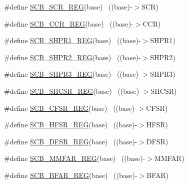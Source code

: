 \begin{DoxyCompactItemize}
\#define \hyperlink{group___s_c_b___register___accessor___macros_ga6cd310502ec11012af2420c92138fb04}{S\+C\+B\+\_\+\+S\+C\+R\+\_\+\+R\+EG}(base)                                            ~((base)-\/$>$S\+CR)
\item 
\#define \hyperlink{group___s_c_b___register___accessor___macros_gae2955c3c122b0cd8454d0015bcac2780}{S\+C\+B\+\_\+\+C\+C\+R\+\_\+\+R\+EG}(base)                                            ~((base)-\/$>$C\+CR)
\item 
\#define \hyperlink{group___s_c_b___register___accessor___macros_gaabf25516ecaf00639084a339a204456f}{S\+C\+B\+\_\+\+S\+H\+P\+R1\+\_\+\+R\+EG}(base)                                        ~((base)-\/$>$S\+H\+P\+R1)
\item 
\#define \hyperlink{group___s_c_b___register___accessor___macros_gaeb160566ffdd3572f046e69f3b79e3e8}{S\+C\+B\+\_\+\+S\+H\+P\+R2\+\_\+\+R\+EG}(base)                                        ~((base)-\/$>$S\+H\+P\+R2)
\item 
\#define \hyperlink{group___s_c_b___register___accessor___macros_ga8c93949e94df4ece6b4fafd94cca708d}{S\+C\+B\+\_\+\+S\+H\+P\+R3\+\_\+\+R\+EG}(base)                                        ~((base)-\/$>$S\+H\+P\+R3)
\item 
\#define \hyperlink{group___s_c_b___register___accessor___macros_ga84042bf531b908ba8afa2bb260acfdb1}{S\+C\+B\+\_\+\+S\+H\+C\+S\+R\+\_\+\+R\+EG}(base)                                        ~((base)-\/$>$S\+H\+C\+SR)
\item 
\#define \hyperlink{group___s_c_b___register___accessor___macros_ga5e429651ec37af4146f8ac231cb483be}{S\+C\+B\+\_\+\+C\+F\+S\+R\+\_\+\+R\+EG}(base)                                          ~((base)-\/$>$C\+F\+SR)
\item 
\#define \hyperlink{group___s_c_b___register___accessor___macros_ga82f9f02807dd20f1f97226fcbeb5771e}{S\+C\+B\+\_\+\+H\+F\+S\+R\+\_\+\+R\+EG}(base)                                          ~((base)-\/$>$H\+F\+SR)
\item 
\#define \hyperlink{group___s_c_b___register___accessor___macros_ga2ac45bf07176acb69b71189cddba46dc}{S\+C\+B\+\_\+\+D\+F\+S\+R\+\_\+\+R\+EG}(base)                                          ~((base)-\/$>$D\+F\+SR)
\item 
\#define \hyperlink{group___s_c_b___register___accessor___macros_gafbf4831267e040e9b4710ae9fb63c2c9}{S\+C\+B\+\_\+\+M\+M\+F\+A\+R\+\_\+\+R\+EG}(base)                                        ~((base)-\/$>$M\+M\+F\+AR)
\item 
\#define \hyperlink{group___s_c_b___register___accessor___macros_ga9932d2c86e9f7cd72b4fbca18863e757}{S\+C\+B\+\_\+\+B\+F\+A\+R\+\_\+\+R\+EG}(base)                                          ~((base)-\/$>$B\+F\+AR)

\end{DoxyCompactItemize}
